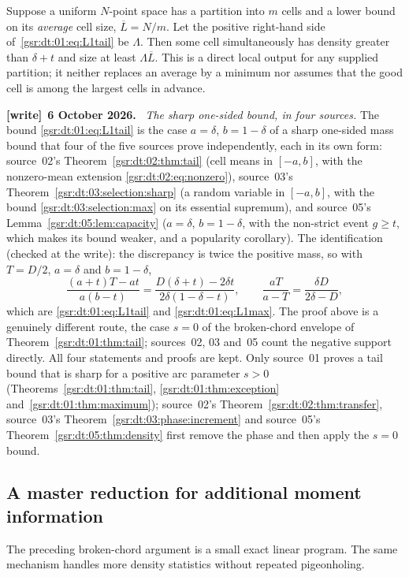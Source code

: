 \documentclass[11pt,letterpaper]{article}
\numberwithin{equation}{section}
\theoremstyle{definition}
\theoremstyle{remark}
\newcommand{\1}{\mathbf 1}
\newenvironment{writenote}[1][]{\par\smallskip\begingroup\small
 \noindent\textbf{[write]}\if\relax\detokenize{#1}\relax\else~\textbf{#1.}\fi\ }%
 {\par\endgroup\smallskip}
\begin{document}
Suppose a uniform $N$-point space has a partition into $m$ cells and a
lower bound on its \emph{average} cell size, $\overline L=N/m$.
Let the positive right-hand side of~\eqref{gsr:dt:01:eq:L1tail} be $\Lambda$.
Then some cell simultaneously has density greater than $\delta+t$ and
size at least $\Lambda\overline L$. This is a direct local output for
any supplied partition; it neither replaces an average by a minimum nor
assumes that the good cell is among the largest cells in advance.
\begin{writenote}[6 October 2026]
\emph{The sharp one-sided bound, in four sources.} The bound \eqref{gsr:dt:01:eq:L1tail} is the case $a=\delta$, $b=1-\delta$ of a sharp one-sided mass bound that four of the five sources prove independently, each in its own form: source~02's Theorem~\ref{gsr:dt:02:thm:tail} (cell means in $[-a,b]$, with the nonzero-mean extension \eqref{gsr:dt:02:eq:nonzero}), source~03's Theorem~\ref{gsr:dt:03:selection:sharp} (a random variable in $[-a,b]$, with the bound \eqref{gsr:dt:03:selection:max} on its essential supremum), and source~05's Lemma~\ref{gsr:dt:05:lem:capacity} ($a=\delta$, $b=1-\delta$, with the non-strict event $g\ge t$, which makes its bound weaker, and a popularity corollary). The identification (checked at the write): the discrepancy is twice the positive mass, so with $T=D/2$, $a=\delta$ and $b=1-\delta$,
\[
 \frac{(a+t)T-at}{a(b-t)}=\frac{D(\delta+t)-2\delta t}{2\delta(1-\delta-t)},\qquad \frac{aT}{a-T}=\frac{\delta D}{2\delta-D},
\]
which are \eqref{gsr:dt:01:eq:L1tail} and \eqref{gsr:dt:01:eq:L1max}. The proof above is a genuinely different route, the case $s=0$ of the broken-chord envelope of Theorem~\ref{gsr:dt:01:thm:tail}; sources~02, 03 and~05 count the negative support directly. All four statements and proofs are kept. Only source~01 proves a tail bound that is sharp for a positive arc parameter $s>0$ (Theorems~\ref{gsr:dt:01:thm:tail}, \ref{gsr:dt:01:thm:exception} and~\ref{gsr:dt:01:thm:maximum}); source~02's Theorem~\ref{gsr:dt:02:thm:transfer}, source~03's Theorem~\ref{gsr:dt:03:phase:increment} and source~05's Theorem~\ref{gsr:dt:05:thm:density} first remove the phase and then apply the $s=0$ bound.
\end{writenote}

\subsection{A master reduction for additional moment information}
The preceding broken-chord argument is a small exact linear program.
The same mechanism handles more density statistics without repeated
pigeonholing.
\end{document}
